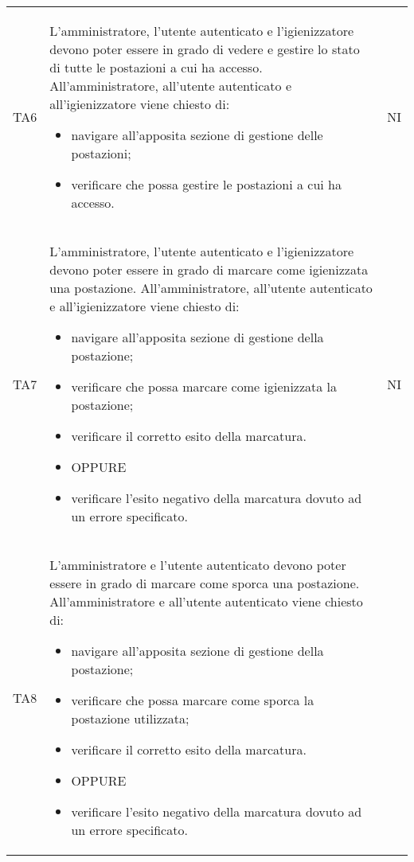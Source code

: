 {\begin{longtable}{ c C{11cm} c }
        TA6&
        L'amministratore, l'utente autenticato e l'igienizzatore devono poter essere in grado di vedere e gestire lo stato di tutte le postazioni a cui ha accesso.\newline
        All'amministratore, all'utente autenticato e all'igienizzatore viene chiesto di:
        \begin{itemize}
            \item navigare all'apposita sezione di gestione delle postazioni;
            \item verificare che possa gestire le postazioni a cui ha accesso.
        \end{itemize}&
        NI\\
        TA7&
        L'amministratore, l'utente autenticato e l'igienizzatore devono poter essere in grado di marcare come igienizzata una postazione.\newline
        All'amministratore, all'utente autenticato e all'igienizzatore viene chiesto di:
        \begin{itemize}
            \item navigare all'apposita sezione di gestione della postazione;
            \item verificare che possa marcare come igienizzata la postazione;
            \item verificare il corretto esito della marcatura.
            \item [] OPPURE
            \item verificare l'esito negativo della marcatura dovuto ad un errore specificato.
        \end{itemize}&
        NI\\
        TA8&
        L'amministratore e l'utente autenticato devono poter essere in grado di marcare come sporca una postazione.\newline
        All'amministratore e all'utente autenticato viene chiesto di:
        \begin{itemize}
            \item navigare all'apposita sezione di gestione della postazione;
            \item verificare che possa marcare come sporca la postazione utilizzata;
            \item verificare il corretto esito della marcatura.
            \item [] OPPURE
            \item verificare l'esito negativo della marcatura dovuto ad un errore specificato.

\end{itemize}
\end{longtable}}

